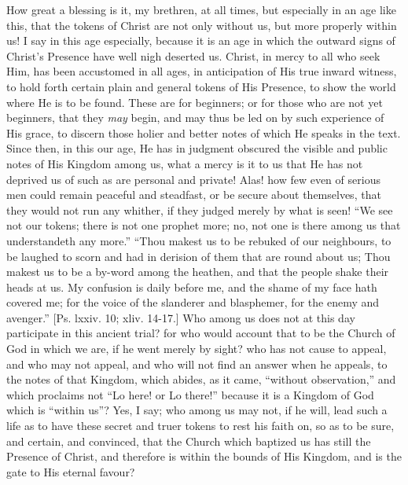 How great a blessing is it, my brethren, at all times, but
especially in an age like this, that the tokens of Christ are not only
without us, but more properly within us! I say in this age especially,
because it is an age in which the outward signs of Christ's Presence
have well nigh deserted us. Christ, in mercy to all who seek Him, has
been accustomed in all ages, in anticipation of His true inward
witness, to hold forth certain plain and general tokens of His
Presence, to show the world where He is to be found. These are for
beginners; or for those who are not yet beginners, that they \emph{may}
begin, and may thus be led on by such experience of His grace, to
discern those holier and better notes of which He speaks in the text.
Since then, in this our age, He has in judgment obscured the visible
and public notes of His Kingdom among us, what a mercy is it to us
that He has not deprived us of such as are personal and private! Alas!
how few even of serious men could remain peaceful and steadfast, or be
secure about themselves, that they would not run any whither, if they
judged merely by what is seen! ``We see not our tokens; there is
not one prophet more; no, not one is there among us that understandeth
any more.'' ``Thou makest us to be rebuked of our neighbours,
to be laughed to scorn and had in derision of them that are round
about us; Thou makest us to be a by-word among the heathen, and that
the people shake their heads at us. My confusion is daily before me,
and the shame of my face hath covered me; for the voice of the
slanderer and blasphemer, for the enemy and avenger.'' [Ps. lxxiv.
10; xliv. 14-17.] Who among us does not at this day participate in
this ancient trial? for who would account that to be the Church of God
in which we are, if he went merely by sight? who has not cause to
appeal, and who may not appeal, and who will not find an answer when
he appeals, to the notes of that Kingdom, which abides, as it came,
``without observation,'' and which proclaims not ``Lo
here! or Lo there!'' because it is a Kingdom of God which is
``within us''? Yes, I say; who among us may not, if he will,
lead such a life as to have these secret and truer tokens to rest his
faith on, so as to be sure, and certain, and convinced, that the
Church which baptized us has still the Presence of Christ, and
therefore is within the bounds of His Kingdom, and is the gate to His
eternal favour?

